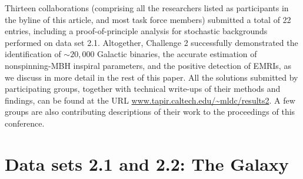 \documentclass{iopart}
\begin{document}
Thirteen collaborations (comprising all the researchers listed as participants in the byline of this article, and most task force members) submitted a total of 22 entries, including a proof-of-principle analysis for stochastic backgrounds performed on data set 2.1.
Altogether, Challenge 2 successfully demonstrated the identification of $\sim 20,000$ Galactic binaries, the accurate estimation of nonspinning-MBH inspiral parameters, and the positive detection of EMRIs, as we discuss in more detail in the rest of this paper. All the solutions submitted by participating groups, together with technical write-ups of their methods and findings, can be found at the URL \url{www.tapir.caltech.edu/~mldc/results2}. A few groups are also contributing descriptions of their work to the proceedings of this conference.

\section{Data sets 2.1 and 2.2: The Galaxy}
\end{document}
